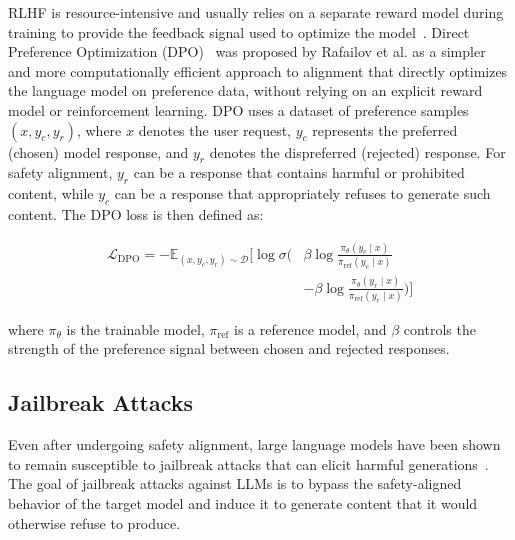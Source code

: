 RLHF is resource-intensive and usually relies on a separate reward model during training to provide the feedback signal used to optimize the model~\cite{ouyang2022rlhf}. Direct Preference Optimization (DPO)~\cite{rafailov2023dpo} was proposed by Rafailov et al. as a simpler and more computationally efficient approach to alignment that directly optimizes the language model on preference data, without relying on an explicit reward model or reinforcement learning. DPO uses a dataset of preference samples $(x, y_c, y_r)$, where $x$ denotes the user request, $y_c$ represents the preferred (chosen) model response, and $y_r$ denotes the dispreferred (rejected) response. For safety alignment, $y_r$ can be a response that contains harmful or prohibited content, while $y_c$ can be a response that appropriately refuses to generate such content. The DPO loss is then defined as:


$$
\begin{aligned}
\mathcal{L}_\text{DPO} = -\mathbb{E}_{(x,y_c,y_r)\sim\mathcal{D}}
\Bigg[
\log \sigma \Bigg(
&\beta \log
\frac{\pi_\theta(y_c \mid x)}
     {\pi_{\mathrm{ref}}(y_c \mid x)}
\\
&-
\beta \log
\frac{\pi_\theta(y_r \mid x)}
     {\pi_{\mathrm{ref}}(y_r \mid x)}
\Bigg)
\Bigg]
\end{aligned}
$$

where $\pi_\theta$ is the trainable model, $\pi_\mathrm{ref}$ is a reference model, and $\beta$ controls the strength of the preference signal between chosen and rejected responses.

\subsection{Jailbreak Attacks}
\label{subsec:background:jailbreaks}

Even after undergoing safety alignment, large language models have been shown to remain susceptible to jailbreak attacks that can elicit harmful generations~\cite{wei2023jailbroken,andriushchenko2025simpleadaptive,ding2023renellm,liu2024autodan,twinbreak,arditi2024refusal,wu2026neurostrike}. The goal of jailbreak attacks against LLMs is to bypass the safety-aligned behavior of the target model and induce it to generate content that it would otherwise refuse to produce.


